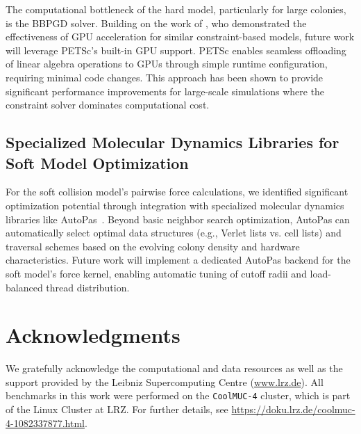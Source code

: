 \documentclass[conference]{IEEEtran}
\begin{document}
The computational bottleneck of the hard model, particularly for large colonies, is the BBPGD solver. Building on the work of \cite{Tasora2008}, who demonstrated the effectiveness of GPU acceleration for similar constraint-based models, future work will leverage PETSc's built-in GPU support. PETSc enables seamless offloading of linear algebra operations to GPUs through simple runtime configuration, requiring minimal code changes. This approach has been shown to provide significant performance improvements for large-scale simulations where the constraint solver dominates computational cost.

\subsection{Specialized Molecular Dynamics Libraries for Soft Model Optimization}

For the soft collision model's pairwise force calculations, we identified significant optimization potential through integration with specialized molecular dynamics libraries like AutoPas~\cite{Gratl2019,Newcome2023}. Beyond basic neighbor search optimization, AutoPas can automatically select optimal data structures (e.g., Verlet lists vs. cell lists) and traversal schemes based on the evolving colony density and hardware characteristics. Future work will implement a dedicated AutoPas backend for the soft model's force kernel, enabling automatic tuning of cutoff radii and load-balanced thread distribution.

\section*{Acknowledgments}

We gratefully acknowledge the computational and data resources as well as the support provided by the Leibniz Supercomputing Centre (\url{www.lrz.de}). All benchmarks in this work were performed on the \texttt{CoolMUC-4} cluster, which is part of the Linux Cluster at LRZ. For further details, see \url{https://doku.lrz.de/coolmuc-4-1082337877.html}.


\newpage

\balance


\newpage
\nobalance


\onecolumn

\appendix
\renewcommand{\thefigure}{A\arabic{figure}}
\renewcommand{\thetable}{A.\arabic{table}}
\setcounter{figure}{0}
\setcounter{table}{0}
\end{document}
